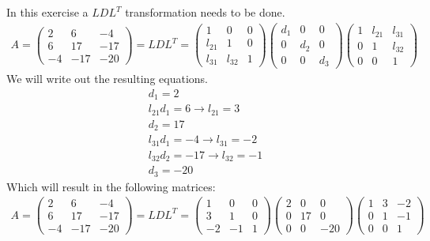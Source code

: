 In this exercise a $LDL^T$ transformation needs to be done.
\begin{gather*}
A = \left( \begin{array}{ccc}
2 & 6 & -4\\
6 & 17 & -17 \\
-4 & -17 & -20 
\end{array} \right) 
= LDL^T = 
\left( \begin{array}{ccc}
1 & 0 & 0 \\
l_{21} & 1 & 0 \\
l_{31} & l_{32} & 1
\end{array} \right)
\left( \begin{array}{ccc}
d_1 & 0 & 0 \\
0 & d_{2} & 0 \\
0 & 0 & d_{3}
\end{array} \right)
\left( \begin{array}{ccc}
1 & l_{21} & l_{31} \\
0 & 1 & l_{32} \\
0 & 0 & 1
\end{array} \right)
\end{gather*}
We will write out the resulting equations.
\begin{gather*}
d_1 = 2 \\
l_{21} d_1 = 6 \rightarrow l_{21} = 3 \\
d_{2} = 17 \\
l_{31} d_1 = -4 \rightarrow l_{31} = -2\\
l_{32} d_2 = -17 \rightarrow l_{32} = -1\\
d_3 = -20
\end{gather*}
Which will result in the following matrices:
\begin{gather*}
A = \left( \begin{array}{ccc}
2 & 6 & -4\\
6 & 17 & -17 \\
-4 & -17 & -20 
\end{array} \right) 
= LDL^T = 
\left( \begin{array}{ccc}
1 & 0 & 0\\
3 & 1 & 0 \\
-2 & -1 & 1 
\end{array} \right)
\left( \begin{array}{ccc}
2 & 0 & 0\\
0 & 17 & 0\\
0 & 0 & -20
\end{array} \right)
\left( \begin{array}{ccc}
1 & 3 & -2 \\
0 & 1 & -1 \\
0 & 0 & 1
\end{array} \right)
\end{gather*}

